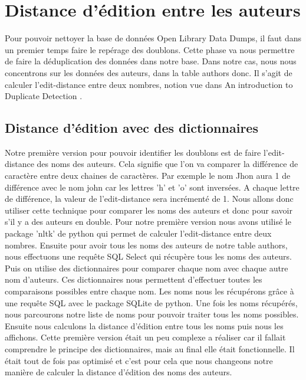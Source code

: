 \documentclass[12pt, a4paper]{article}
\begin{document}
\section{Distance d'édition entre les auteurs}

Pour pouvoir nettoyer la base de données Open Library Data Dumps, il faut dans un premier temps faire le repérage des doublons. Cette phase va nous permettre de faire la déduplication des données dans notre base. Dans notre cas, nous nous concentrons sur les données des auteurs, dans la table authors donc. Il s'agit de calculer l'edit-distance entre deux nombres, notion vue dans  An introduction to Duplicate Detection \cite{10.5555/1841211}.

\subsection{Distance d'édition avec des dictionnaires}
Notre première version pour pouvoir identifier les doublons est de faire l'edit-distance des noms des auteurs. Cela signifie que l'on va comparer la différence de caractère entre deux chaines de caractères. Par exemple le nom Jhon aura 1 de différence avec le nom john car les lettres 'h' et 'o' sont inversées. A chaque lettre de différence, la valeur de l'edit-distance sera incrémenté de 1. Nous allons donc utiliser cette technique pour comparer les noms des auteurs et donc pour savoir s'il y a des auteurs en double. Pour notre première version nous avons utilisé le package 'nltk' de python qui permet de calculer l'edit-distance entre deux nombres. Ensuite pour avoir tous les noms des auteurs de notre table authors, nous effectuons une requête SQL Select qui récupère tous les noms des auteurs. Puis on utilise des dictionnaires pour comparer chaque nom avec chaque autre nom d'auteurs. Ces dictionnaires nous permettent d'effectuer toutes les comparaisons possibles entre chaque nom. Les noms nous les récupérons grâce à une requête SQL avec le package SQLite de python. Une fois les noms récupérés, nous parcourons notre liste de noms pour pouvoir traiter tous les noms possibles. Ensuite nous calculons la distance d'édition entre tous les noms puis nous les affichons. Cette première version était un peu complexe a réaliser car il fallait comprendre le principe des dictionnaires, mais au final elle était fonctionnelle. Il était tout de fois pas optimisé et c'est pour cela que nous changeons notre manière de calculer la distance d'édition des noms des auteurs.
\end{document}
